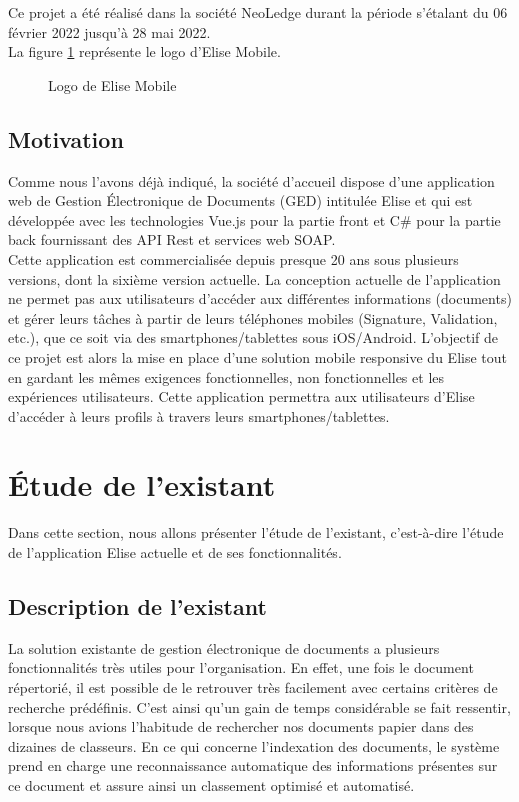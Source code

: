 Ce projet a été réalisé dans la société NeoLedge durant la période s'étalant du 06 février 2022 jusqu'à 28 mai 2022.\\

La figure \ref{fig:logoEliseMobile} représente le logo d'Elise Mobile.\\

\begin{figure}
\centering
{}
\caption{Logo de Elise Mobile}
\label{fig:logoEliseMobile}
\end{figure}

\subsection{Motivation}
Comme nous l'avons déjà indiqué, la société d'accueil dispose d'une application web de Gestion Électronique de Documents (GED) intitulée Elise et qui est développée avec les technologies Vue.js pour la partie front et C\# pour la partie back fournissant des API Rest et services web SOAP.\\
Cette application est commercialisée depuis presque 20 ans sous plusieurs versions, dont la sixième version actuelle. La conception actuelle de l'application ne permet pas aux utilisateurs d'accéder aux différentes informations (documents) et gérer leurs tâches à partir de leurs téléphones mobiles (Signature, Validation, etc.), que ce soit via des smartphones/tablettes sous iOS/Android.
L'objectif de ce projet est alors la mise en place d'une solution mobile responsive du Elise tout en gardant les mêmes exigences fonctionnelles, non fonctionnelles et les expériences utilisateurs. Cette application permettra aux utilisateurs d'Elise d'accéder à leurs profils à travers leurs smartphones/tablettes.

\section{Étude de l'existant}
Dans cette section, nous allons présenter l'étude de l'existant, c'est-à-dire l'étude de l'application Elise actuelle et de ses fonctionnalités.
\subsection{Description de l'existant}
La solution existante de gestion électronique de documents a plusieurs fonctionnalités très utiles pour l'organisation. En effet, une fois le document répertorié, il est possible de le retrouver très facilement avec certains critères de recherche prédéfinis. C'est ainsi qu'un gain de temps considérable se fait ressentir, lorsque nous avions l'habitude de rechercher nos documents papier dans des dizaines de classeurs. En ce qui concerne l'indexation des documents, le système prend en charge une reconnaissance automatique des informations présentes sur ce document et assure ainsi un classement optimisé et automatisé.


